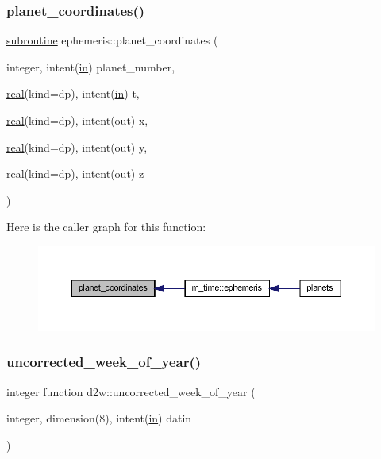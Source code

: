 \subsubsection{\texorpdfstring{planet\+\_\+coordinates()}{planet\_coordinates()}}
{\footnotesize\ttfamily \hyperlink{M__stopwatch_83_8txt_acfbcff50169d691ff02d4a123ed70482}{subroutine} ephemeris\+::planet\+\_\+coordinates (\begin{DoxyParamCaption}\item[{integer, intent(\hyperlink{M__journal_83_8txt_afce72651d1eed785a2132bee863b2f38}{in})}]{planet\+\_\+number,  }\item[{\hyperlink{read__watch_83_8txt_abdb62bde002f38ef75f810d3a905a823}{real}(kind=dp), intent(\hyperlink{M__journal_83_8txt_afce72651d1eed785a2132bee863b2f38}{in})}]{t,  }\item[{\hyperlink{read__watch_83_8txt_abdb62bde002f38ef75f810d3a905a823}{real}(kind=dp), intent(out)}]{x,  }\item[{\hyperlink{read__watch_83_8txt_abdb62bde002f38ef75f810d3a905a823}{real}(kind=dp), intent(out)}]{y,  }\item[{\hyperlink{read__watch_83_8txt_abdb62bde002f38ef75f810d3a905a823}{real}(kind=dp), intent(out)}]{z }\end{DoxyParamCaption})\hspace{0.3cm}{\ttfamily [private]}}

Here is the caller graph for this function\+:
\nopagebreak
\begin{figure}[H]
\begin{center}
\leavevmode
\includegraphics[width=350pt]{M__time_8f90_a7d6b522799e158810bf530a1dedbc03e_icgraph}
\end{center}
\end{figure}
\mbox{\label{M__time_8f90_a4a68c5e906616f64da0c3d165fc41479}} 
\subsubsection{\texorpdfstring{uncorrected\+\_\+week\+\_\+of\+\_\+year()}{uncorrected\_week\_of\_year()}}
{\footnotesize\ttfamily integer function d2w\+::uncorrected\+\_\+week\+\_\+of\+\_\+year (\begin{DoxyParamCaption}\item[{integer, dimension(8), intent(\hyperlink{M__journal_83_8txt_afce72651d1eed785a2132bee863b2f38}{in})}]{datin }\end{DoxyParamCaption})\hspace{0.3cm}{\ttfamily [private]}}



